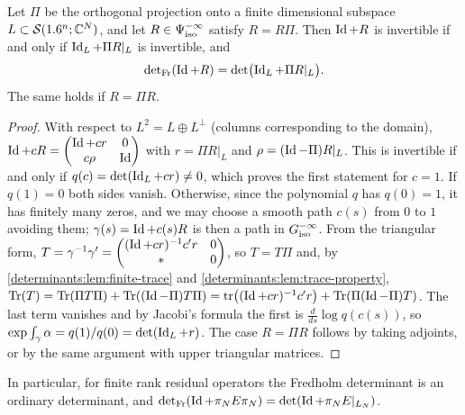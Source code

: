 \begin{lemma}\label{determinants:lem:reduction}
  Let $\Pi$ be the orthogonal projection onto a finite dimensional subspace
  $L\subset\mathcal{S}(1.6^n;\mathbb{C}^N)$, and let $R\in\Psi^{-\infty}_{\mathrm{iso}}$ satisfy $R=R\Pi$.
  Then $\operatorname{Id}+R$ is invertible if and only if $\operatorname{Id}_L+\Pi R|_L$ is invertible, and
  \begin{equation*}
    \operatorname{det}_{\mathrm{Fr}}(\operatorname{Id}+R)=\det\bigl(\operatorname{Id}_L+\Pi R|_L\bigr).
  \end{equation*}
  The same holds if $R=\Pi R$.
\end{lemma}
\begin{proof}
  With respect to $L^2=L\oplus L^\perp$ (columns corresponding to the
  domain), $\operatorname{Id}+cR=\begin{pmatrix}\operatorname{Id}+cr&0\\c\rho&\operatorname{Id}\end{pmatrix}$ with
  $r=\Pi R|_L$ and $\rho=(\operatorname{Id}-\Pi)R|_L$. This is invertible if and only if
  $q(c)=\det(\operatorname{Id}_L+cr)\ne0$, which proves the first statement for $c=1$. If
  $q(1)=0$ both sides vanish. Otherwise, since the polynomial $q$ has
  $q(0)=1$, it has finitely many zeros, and we may choose a smooth path $c(s)$
  from $0$ to $1$ avoiding them; $\gamma(s)=\operatorname{Id}+c(s)R$ is then a path in
  $G^{-\infty}_{\mathrm{iso}}$. From the triangular form,
  $T=\gamma^{-1}\gamma'=\begin{pmatrix}(\operatorname{Id}+cr)^{-1}c'r&0\\ *&0\end{pmatrix}$,
  so $T=T\Pi$ and, by \cref{determinants:lem:finite-trace} and
  \cref{determinants:lem:trace-property},
  $\operatorname{Tr}(T)=\operatorname{Tr}(\Pi T\Pi)+\operatorname{Tr}((\operatorname{Id}-\Pi)T\Pi)=\operatorname{tr}\bigl((\operatorname{Id}+cr)^{-1}c'r\bigr)+\operatorname{Tr}(\Pi(\operatorname{Id}-\Pi)T)$.
  The last term vanishes and by Jacobi's formula the first is
  $\frac{d}{ds}\log q(c(s))$, so $\exp\int_\gamma\alpha=q(1)/q(0)=\det(\operatorname{Id}_L+r)$.
  The case $R=\Pi R$ follows by taking adjoints, or by the same argument with
  upper triangular matrices.
\end{proof}

In particular, for finite rank residual operators the Fredholm determinant is
an ordinary determinant, and $\operatorname{det}_{\mathrm{Fr}}(\operatorname{Id}+\pi_NE\pi_N)=\det(\operatorname{Id}+\pi_NE|_{L_N})$.

